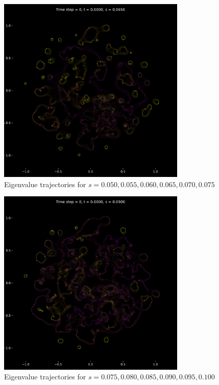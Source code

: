 \documentclass{article}
\begin{document}
	\newpage

	\begin{figure}[htbp]
		\centering
		\includegraphics[width=0.8\textwidth]{figures/frame100to150.pdf}
		\caption{Eigenvalue trajectories for $s= 0.050, 0.055, 0.060, 0.065, 0.070, 0.075$ }
		\label{fig:pdf_image}
	\end{figure}

	\newpage

	\begin{figure}[htbp]
		\centering
		\includegraphics[width=0.8\textwidth]{figures/frame150to200.pdf}
		\caption{Eigenvalue trajectories for $s= 0.075, 0.080, 0.085, 0.090, 0.095, 0.100$ }
		\label{fig:pdf_image}
	\end{figure}
\end{document}
